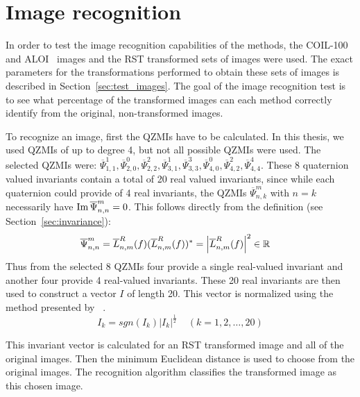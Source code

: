 \section{Image recognition}
In order to test the image recognition capabilities of the methods, the COIL-100~\cite{coil} and ALOI~\cite{aloi} images and the RST transformed sets of images were used. The exact parameters for the transformations performed to obtain these sets of images is described in Section~\ref{sec:test_images}.
The goal of the image recognition test is to see what percentage of the transformed images can each method correctly identify from the original, non-transformed images.

To recognize an image, first the QZMIs have to be calculated. In this thesis, we used QZMIs of up to degree 4, but not all possible QZMIs were used. The selected QZMIs were: $\overline{\Psi}_{1,1}^1, \overline{\Psi}_{2,0}^0, \overline{\Psi}_{2,2}^2, \overline{\Psi}_{3,1}^1, \overline{\Psi}_{3,3}^3, \overline{\Psi}_{4,0}^0, \overline{\Psi}_{4,2}^2, \overline{\Psi}_{4,4}^4$. These 8 quaternion valued invariants contain a total of 20 real valued invariants, since while each quaternion could provide of 4 real invariants, the QZMIs $\overline{\Psi}_{n,k}^m$ with $n = k$ necessarily have $\operatorname{Im}{\overline{\Psi}_{n,n}^m} = 0$.
This follows directly from the definition (see Section~\ref{sec:invariance}): 
\begin{gather*}
    \begin{split}
        \overline{\Psi}_{n,n}^m &= \overline{L}_{n,m}^R(f)(\overline{L}_{n,m}^R(f))^* = \left|\overline{L}_{n,m}^R(f)\right|^2 \in \mathbb{R}
    \end{split}
\end{gather*}
Thus from the selected 8 QZMIs four provide a single real-valued invariant and another four provide 4 real-valued invariants. These 20 real invariants are then used to construct a vector $I$ of length 20.
This vector is normalized using the method presented by \citeauthor{affine_color}~\cite{affine_color}.
$$
I_k = sgn(I_k)\left|I_k\right|^\frac{1}{2} \;\;\;\; (k = 1,2,\ldots,20)
$$

This invariant vector is calculated for an RST transformed image and all of the original images. Then the minimum Euclidean distance is used to choose from the original images. The recognition algorithm classifies the transformed image as this chosen image.

